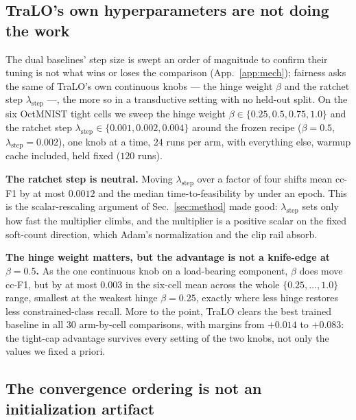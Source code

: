 \documentclass[10pt]{article}
\begin{document}
\subsection{TraLO's own hyperparameters are not doing the work}
\label{app:tralo-sweep}


The dual baselines' step size is swept an order of magnitude to confirm
their tuning is not what wins or loses the comparison
(App.~\ref{app:mech}); fairness asks the same of TraLO's own
continuous knobs{ --- the hinge weight $\beta$ and the ratchet step
$\lambda_{\text{step}}$ ---}, the more so in a transductive setting with no
held-out split. On the six OctMNIST tight cells we sweep the hinge
weight $\beta\in\{0.25,0.5,0.75,1.0\}$ and the ratchet step
$\lambda_{\text{step}}\in\{0.001,0.002,0.004\}$ around the frozen
recipe ($\beta{=}0.5$, $\lambda_{\text{step}}{=}0.002$), one knob at a
time, $24$ runs per arm, with everything else, warmup cache included,
held fixed ($120$ runs).

\textbf{The ratchet step is neutral.} Moving $\lambda_{\text{step}}$
over a factor of four shifts mean cc-F1 by at most $0.0012$ and the
median time-to-feasibility by under an epoch. This is the
scalar-rescaling argument of Sec.~\ref{sec:method} made good:
$\lambda_{\text{step}}$ sets only how fast the multiplier climbs, and
the multiplier is a positive scalar on the fixed soft-count direction,
which Adam's normalization and the clip rail absorb.

\textbf{The hinge weight matters, but the advantage is not a
knife-edge at $\beta{=}0.5$.} As the one continuous knob on a
load-bearing component, $\beta$ does move cc-F1, but by at most $0.003$
in the six-cell mean across the whole $\{0.25,\dots,1.0\}$ range,
smallest at the weakest hinge $\beta{=}0.25$, exactly where less hinge
restores less constrained-class recall. More to the point, TraLO
clears the best trained baseline in all $30$ arm-by-cell comparisons,
with margins from $+0.014$ to {$+0.083$}: the tight-cap advantage
survives every setting of the two knobs, not only the values we fixed
a priori.

\subsection{The convergence ordering is not an initialization artifact}
\label{app:init}
\end{document}
